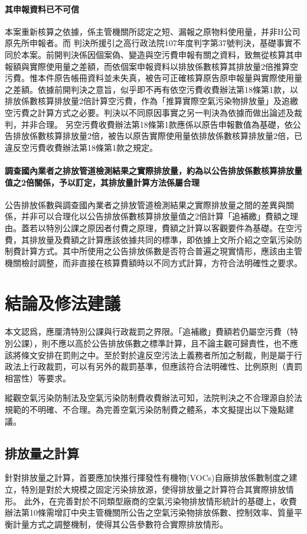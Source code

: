 \documentclass[14pt,a4paper]{article}
\begin{document}
\paragraph*{其申報資料已不可信} 本案重新核算之依據，係主管機關所認定之短、漏報之原物料使用量，并非H公司原先所申報者。而
判決所援引之高行政法院107年度判字第37號判決，基礎事實不同於本案。前開判決係因個案偽、變造與空污費申報有關之資料，致無從核算其申報額與實際使用量之差額，而依個案申報資料以排放係數核算其排放量2倍推算空污費。惟本件原告帳冊資料並未失真，被告可正確核算原告原申報量與實際使用量之差額。依據前開判決之意旨，似乎即不再有依空污費收費辦法第18條第1款，以排放係數核算排放量2倍計算空污費，作為「推算實際空氣污染物排放量」及追繳空污費之計算方式之必要。判決以不同原因事實之另一判決為依據而做出論述及裁判，并非合理。
另空污費收費辦法第18條第1款應係以原告申報數值為基礎，依公告排放係數核算排放量2倍，被告以原告實際使用量依排放係數核算排放量2倍，已違反空污費收費辦法第18條第1款之規定。


\paragraph*{調查國內業者之排放管道檢測結果之實際排放量，約為以公告排放係數核算排放量值之2倍關係，予以訂定，其排放量計算方法係屬合理}
公告排放係數與調查國內業者之排放管道檢測結果之實際排放量之間的差異與關係，并非可以合理化以公告排放係數核算排放量值之2倍計算「追補繳」費額之理由。蓋若以特別公課之原因者付費之原理，費額之計算以客觀要件為基礎。在空污費，其排放量及費額之計算應該依據共同的標準，即依據上文所介紹之空氣污染防制費計算方式。其中所使用之公告排放係數是否符合普遍之現實情形，應該由主管機關檢討調整，而非直接在核算費額時以不同方式計算，方符合法明確性之要求。


\section{結論及修法建議}
本文認爲，應厘清特別公課與行政裁罰之界限。「追補繳」費額若仍屬空污費（特別公課），則不應以高於公告排放係數之標準計算，且不論主觀可歸責性，也不應該將條文安排在罰則之中。至於對於違反空污法上義務者所加之制裁，則是屬于行政法上行政裁罰，可以有另外的裁罰基準，但應該符合法明確性、比例原則（責罰相當性）等要求。

縱觀空氣污染防制法及空氣污染防制費收費辦法可知，法院判決之不合理源自於法規範的不明確、不合理。為完善空氣污染防制費之體系，本文擬提出以下幾點建議。
\subsection{排放量之計算}
針對排放量之計算，首要應加快推行揮發性有機物(VOCs)自廠排放係數制度之建立，特別是對於大規模之固定污染排放源，使得排放量之計算符合其實際排放情形。
此外，在完善對於不同類型廠商的空氣污染物排放情形統計的基礎上，收費辦法第10條需增訂中央主管機關所公告之空氣污染物排放係數、控制效率、質量平衡計量方式之調整機制，使得其公告參數符合實際排放情形。
\end{document}
